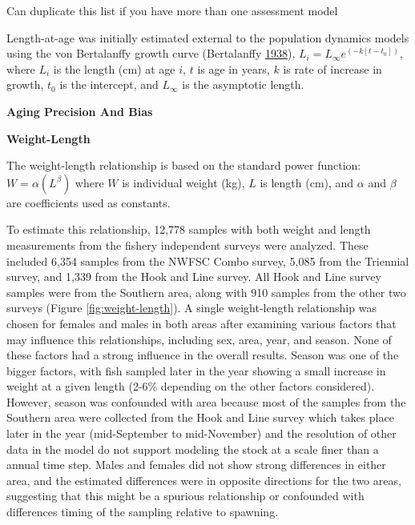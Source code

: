 \documentclass[12pt,]{article}
\begin{document}
Can duplicate this list if you have more than one assessment model

Length-at-age was initially estimated external to the population
dynamics models using the von Bertalanffy growth curve (Bertalanffy
\protect\hyperlink{ref-vonB1938}{1938}),
\(L_i = L_{\infty}e^{(-k[t-t_0])}\), where \(L_i\) is the length (cm) at
age \(i\), \(t\) is age in years, \(k\) is rate of increase in growth,
\(t_0\) is the intercept, and \(L_{\infty}\) is the asymptotic length.

\vspace{.5cm}

\textbf{Aging Precision And Bias}

\vspace{.5cm}

\textbf{Weight-Length}

The weight-length relationship is based on the standard power function:
\(W = \alpha(L^\beta)\) where \(W\) is individual weight (kg), \(L\) is
length (cm), and \(\alpha\) and \(\beta\) are coefficients used as
constants.

To estimate this relationship, 12,778 samples with both weight and
length measurements from the fishery independent surveys were analyzed.
These included 6,354 samples from the NWFSC Combo survey, 5,085 from the
Triennial survey, and 1,339 from the Hook and Line survey. All Hook and
Line survey samples were from the Southern area, along with 910 samples
from the other two surveys (Figure \ref{fig:weight-length}). A single
weight-length relationship was chosen for females and males in both
areas after examining various factors that may influence this
relationships, including sex, area, year, and season. None of these
factors had a strong influence in the overall results. Season was one of
the bigger factors, with fish sampled later in the year showing a small
increase in weight at a given length (2-6\% depending on the other
factors considered). However, season was confounded with area because
most of the samples from the Southern area were collected from the Hook
and Line survey which takes place later in the year (mid-September to
mid-November) and the resolution of other data in the model do not
support modeling the stock at a scale finer than a annual time step.
Males and females did not show strong differences in either area, and
the estimated differences were in opposite directions for the two areas,
suggesting that this might be a spurious relationship or confounded with
differences timing of the sampling relative to spawning.
\end{document}

